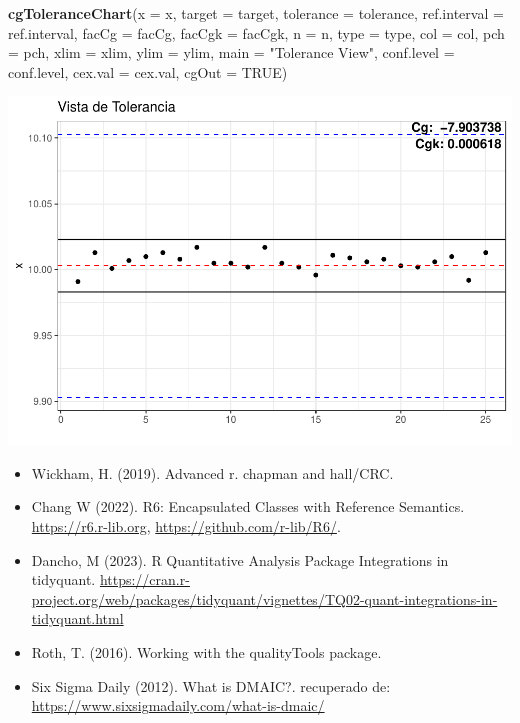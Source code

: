 \documentclass[
]{book}
\newenvironment{Shaded}{\begin{snugshade}}{\end{snugshade}}
\newcommand{\AttributeTok}[1]{\textcolor[rgb]{0.13,0.29,0.53}{#1}}
\newcommand{\ConstantTok}[1]{\textcolor[rgb]{0.56,0.35,0.01}{#1}}
\newcommand{\FunctionTok}[1]{\textcolor[rgb]{0.13,0.29,0.53}{\textbf{#1}}}
\newcommand{\NormalTok}[1]{#1}
\newcommand{\StringTok}[1]{\textcolor[rgb]{0.31,0.60,0.02}{#1}}
\providecommand{\tightlist}{%
  \setlength{\itemsep}{0pt}\setlength{\parskip}{0pt}}
\begin{document}
\begin{Shaded}
\begin{Highlighting}[]
\FunctionTok{cgToleranceChart}\NormalTok{(}\AttributeTok{x =}\NormalTok{ x, }\AttributeTok{target =}\NormalTok{ target, }\AttributeTok{tolerance =}\NormalTok{ tolerance, }
                 \AttributeTok{ref.interval =}\NormalTok{ ref.interval, }\AttributeTok{facCg =}\NormalTok{ facCg, }\AttributeTok{facCgk =}\NormalTok{ facCgk, }
                 \AttributeTok{n =}\NormalTok{ n, }\AttributeTok{type =}\NormalTok{ type, }\AttributeTok{col =}\NormalTok{ col, }\AttributeTok{pch =}\NormalTok{ pch, }\AttributeTok{xlim =}\NormalTok{ xlim, }
                 \AttributeTok{ylim =}\NormalTok{ ylim, }\AttributeTok{main =} \StringTok{"Tolerance View"}\NormalTok{, }\AttributeTok{conf.level =}\NormalTok{ conf.level, }
                 \AttributeTok{cex.val =}\NormalTok{ cex.val, }\AttributeTok{cgOut =} \ConstantTok{TRUE}\NormalTok{)}
\end{Highlighting}
\end{Shaded}

\includegraphics{Libro_TidyQualityTools_files/figure-latex/unnamed-chunk-147-1.pdf}

\begin{itemize}
\tightlist
\item
  Wickham, H. (2019). Advanced r. chapman and hall/CRC.
\item
  Chang W (2022). R6: Encapsulated Classes with Reference Semantics. \url{https://r6.r-lib.org}, \url{https://github.com/r-lib/R6/}.
\item
  Dancho, M (2023). R Quantitative Analysis Package Integrations in tidyquant. \url{https://cran.r-project.org/web/packages/tidyquant/vignettes/TQ02-quant-integrations-in-tidyquant.html}
\item
  Roth, T. (2016). Working with the qualityTools package.
\item
  Six Sigma Daily (2012). What is DMAIC?. recuperado de: \url{https://www.sixsigmadaily.com/what-is-dmaic/}
\end{itemize}

  
\end{document}
